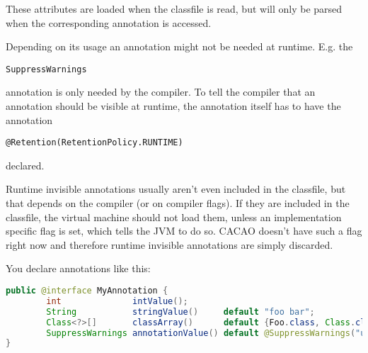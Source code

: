 \documentclass[a4paper, 10pt, titlepage]{scrartcl} %
\begin{document}
These attributes are loaded when the classfile is read, but will only be parsed
when the corresponding annotation is accessed.

Depending on its usage an annotation might not be needed at runtime. E.g. the
\begin{scriptsize}\verb|SuppressWarnings|\end{scriptsize} annotation is only needed by the compiler. To tell the
compiler that an annotation should be visible at runtime, the annotation itself
has to have the annotation \begin{scriptsize}\verb||\hspace{0.0pt}\verb|@|\hspace{0.0pt}\verb|Retention|\hspace{0.0pt}\verb|(|\hspace{0.0pt}\verb|RetentionPolicy|\hspace{0.0pt}\verb|.|\hspace{0.0pt}\verb|RUNTIME|\hspace{0.0pt}\verb|)|\hspace{0.0pt}\verb||\end{scriptsize} declared.

Runtime invisible annotations usually aren't even included in the classfile,
but that depends on the compiler (or on compiler flags). If they are included
in the classfile, the virtual machine should not load them, unless an
implementation specific flag is set, which tells the JVM to do so. CACAO
doesn't have such a flag right now and therefore runtime invisible annotations
are simply discarded.

You declare annotations like this:
\begin{lstlisting}[language=Java]
public @interface MyAnnotation {
		int              intValue();
		String           stringValue()     default "foo bar";
		Class<?>[]       classArray()      default {Foo.class, Class.class};
		SuppressWarnings annotationValue() default @SuppressWarnings("unused");
}
\end{lstlisting}
\end{document}
